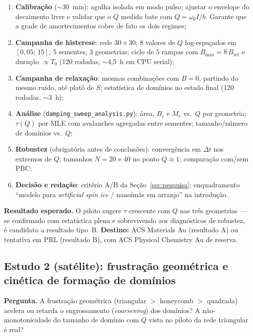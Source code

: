 \documentclass[11pt,a4paper]{article}
\newcommand{\code}[1]{\texttt{#1}}
\begin{document}
\begin{enumerate}
\item \textbf{Calibração} ($\sim$30~min): agulha isolada em modo pulso;
ajustar o envelope do decaimento livre e validar que o $Q$ medido bate
com $Q = \omega_0 I / b$. Garante que a grade de amortecimentos cobre de
fato os dois regimes;
\item \textbf{Campanha de histerese}: rede $30\times30$; 8 valores de
$Q$ log-espaçados em $[0{,}05;\,15]$; 5 sementes; 3 geometrias; ciclo de
5 rampas com $B_{\max} = 8\,B_{\mathrm{ref}}$ e duração $\propto T_0$
(120 rodadas, $\sim$4{,}5~h em CPU serial);
\item \textbf{Campanha de relaxação}: mesmas combinações com $B = 0$,
partindo do mesmo ruído, até platô de $S$; estatística de domínios no
estado final (120 rodadas, $\sim$3~h);
\item \textbf{Análise} (\code{damping\_sweep\_analysis.py}): área,
$B_c$ e $M_r$ vs.\ $Q$ por geometria; $\tau(Q)$ por MLE com avalanches
agregadas entre sementes; tamanho/número de domínios vs.\ $Q$;
\item \textbf{Robustez} (obrigatória antes de conclusões): convergência
em $\Delta t$ nos extremos de $Q$; tamanhos $N = 20$ e $40$ no ponto
$Q \approx 1$; comparação com/sem PBC;
\item \textbf{Decisão e redação}: critério A/B da
Seção~\ref{sec:pesquisa}; enquadramento ``modelo para \emph{artificial
spin ice} / nanoímãs em arranjo'' na introdução.
\end{enumerate}

\textbf{Resultado esperado.} O piloto sugere $\tau$ crescente com $Q$
nas três geometrias --- se confirmado com estatística plena e sobrevivendo
aos diagnósticos de robustez, é candidato a resultado tipo~B.
\textbf{Destino:} ACS Materials Au (resultado A) ou tentativa em PRL
(resultado B), com ACS Physical Chemistry Au de reserva.

\subsection{Estudo 2 (satélite): frustração geométrica e cinética de
formação de domínios}

\textbf{Pergunta.} A frustração geométrica (triangular $>$ honeycomb $>$
quadrada) acelera ou retarda o engrossamento (\emph{coarsening}) dos
domínios? A não-monotonicidade do tamanho de domínio com $Q$ vista no
piloto da rede triangular é real?
\end{document}
